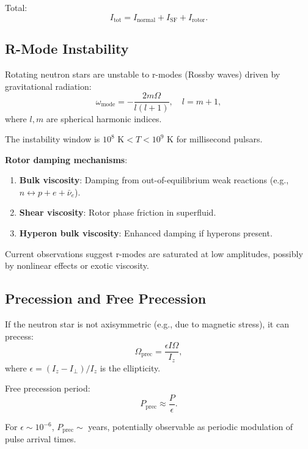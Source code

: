 \documentclass[12pt,a4paper]{article}
\theoremstyle{definition}
\theoremstyle{remark}
\begin{document}
Total:
\begin{equation}
I_{\text{tot}} = I_{\text{normal}} + I_{\text{SF}} + I_{\text{rotor}}.
\end{equation}

\subsection{R-Mode Instability}

Rotating neutron stars are unstable to r-modes (Rossby waves) driven by gravitational radiation:
\begin{equation}
\omega_{\text{mode}} = -\frac{2m\Omega}{l(l+1)}, \quad l = m + 1,
\end{equation}
where $l, m$ are spherical harmonic indices.

The instability window is $10^8 \text{ K} < T < 10^9$ K for millisecond pulsars.

\textbf{Rotor damping mechanisms}:
\begin{enumerate}
\item \textbf{Bulk viscosity}: Damping from out-of-equilibrium weak reactions (e.g., $n \leftrightarrow p + e + \bar{\nu}_e$).
\item \textbf{Shear viscosity}: Rotor phase friction in superfluid.
\item \textbf{Hyperon bulk viscosity}: Enhanced damping if hyperons present.
\end{enumerate}

Current observations suggest r-modes are saturated at low amplitudes, possibly by nonlinear effects or exotic viscosity.

\subsection{Precession and Free Precession}

If the neutron star is not axisymmetric (e.g., due to magnetic stress), it can precess:
\begin{equation}
\Omega_{\text{prec}} = \frac{\epsilon I \Omega}{I_z},
\end{equation}
where $\epsilon = (I_z - I_\perp)/I_z$ is the ellipticity.

Free precession period:
\begin{equation}
P_{\text{prec}} \approx \frac{P}{\epsilon}.
\end{equation}

For $\epsilon \sim 10^{-6}$, $P_{\text{prec}} \sim$ years, potentially observable as periodic modulation of pulse arrival times.
\end{document}
